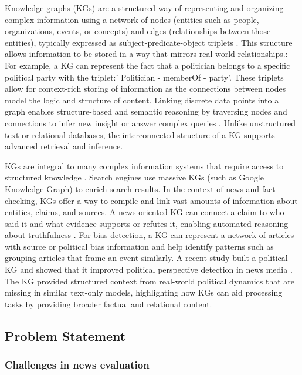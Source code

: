 \documentclass{scrartcl}
\begin{document}
Knowledge graphs (KGs) are a structured way of representing and organizing complex information using a network of nodes (entities such as people, organizations, events, or concepts) and edges (relationships between those entities), typically expressed as subject-predicate-object triplets \cite{r7}. This structure allows information to be stored in a way that mirrors real-world relationships.: For example, a KG can represent the fact that a politician belongs to a specific political party with the triplet:' Politician - memberOf - party'. These triplets allow for context-rich storing of information as the connections between nodes model the logic and structure of content. Linking discrete data points into a graph enables structure-based and semantic reasoning by traversing nodes and connections to infer new insight or answer complex queries \cite{r8}. Unlike unstructured text or relational databases, the interconnected structure of a KG supports advanced retrieval and inference.  

KGs are integral to many complex information systems that require access to structured knowledge  \cite{r9}. Search engines use massive KGs (such as Google Knowledge Graph) to enrich search results. In the context of news and fact-checking, KGs offer a way to compile and link vast amounts of information about entities, claims, and sources. A news oriented KG can connect a claim to who said it and what evidence supports or refutes it, enabling automated reasoning about truthfulness \cite{r10}.
For bias detection, a KG can represent a network of articles with source or political bias information and help identify patterns such as grouping articles that frame an event similarly. A recent study built a political KG and showed that it improved political perspective detection in news media  \cite{r11}. The KG provided structured context from real-world political dynamics that are missing in similar text-only models, highlighting how KGs can aid processing tasks by providing broader factual and relational content.


\subsection{Problem Statement}
\subsubsection{Challenges in news evaluation }
\end{document}
